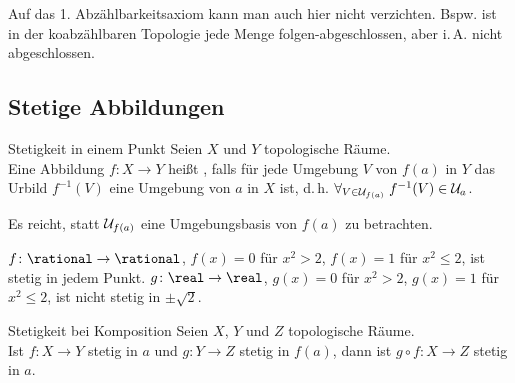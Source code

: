\begin{Bem}
    Auf das 1. Abzählbarkeitsaxiom kann man auch hier nicht verzichten.
    Bspw. ist in der koabzählbaren Topologie jede Menge
    folgen-abgeschlossen, aber i.\,A. nicht abgeschlossen.
\end{Bem}

\subsection{%
    Stetige Abbildungen%
}

\begin{Def}{Stetigkeit in einem Punkt}
    Seien $X$ und $Y$ topologische Räume. \\
    Eine Abbildung $f\colon X \rightarrow Y$ heißt
    , falls für jede Umgebung $V$ von $f(a)$ in
    $Y$ das Urbild $f^{-1}(V)$ eine
    Umgebung von $a$ in $X$ ist, d.\,h.
    $\forall_{V \in \mathcal{U}_{f(a)}}\; f^{-1}(V) \in \mathcal{U}_a$.
\end{Def}

\begin{Bem}
    Es reicht, statt $\mathcal{U}_{f(a)}$ eine Umgebungsbasis von $f(a)$ zu betrachten.
\end{Bem}

\begin{Bsp}
    $f\colon \rational \rightarrow \rational$, $f(x) = 0$ für $x^2 > 2$,
    $f(x) = 1$ für $x^2 \le 2$, ist stetig in jedem Punkt.
    $g\colon \real \rightarrow \real$, $g(x) = 0$ für $x^2 > 2$,
    $g(x) = 1$ für $x^2 \le 2$, ist nicht stetig in $\pm \sqrt{2}$.
\end{Bsp}

\begin{Satz}{Stetigkeit bei Komposition}
    Seien $X$, $Y$ und $Z$ topologische Räume. \\
    Ist $f\colon X \rightarrow Y$ stetig in $a$ und
    $g\colon Y \rightarrow Z$ stetig in $f(a)$, dann ist
    $g \circ f\colon X \rightarrow Z$ stetig in $a$.
\end{Satz}

\linie

